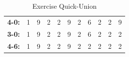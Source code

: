 \documentclass[paper=a4, fontsize=11pt]{scrartcl} %
\numberwithin{equation}{section} %
\numberwithin{figure}{section} %
\numberwithin{table}{section} %
\begin{document}
\begin{table}[]
\begin{tabular}{c|cccccccccc}
\multicolumn{1}{|c|}{\textbf{4-0:}} & 1                      & 9                      & 2                      & 2                      & 9                      & 2                      & 6                      & 2                      & 2                      & 9                      \\ \cline{1-1}
\multicolumn{1}{|c|}{\textbf{3-0:}} & 1                      & 9                      & 2                      & 2                      & 9                      & 2                      & 6                      & 2                      & 2                      & 2                      \\ \cline{1-1}
\multicolumn{1}{|c|}{\textbf{4-6:}} & 1                      & 9                      & 2                      & 2                      & 9                      & 2                      & 2                      & 2                      & 2                      & 2                      \\ \cline{1-1}
\end{tabular}
\label{tab:exerciseQuickUnion}
\caption{Exercise Quick-Union}
\end{table}


\end{document}
